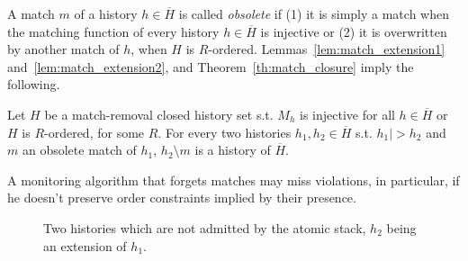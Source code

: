 A match $m$ of a history $h\in  \overline{H}$ is called \emph{obsolete} if (1) it is simply a
match when the matching function of every history $h\in \overline{H}$
is injective or (2) it is overwritten by another match of $h$, when $H$
is $R$-ordered.
Lemmas~\ref{lem:match_extension1} and~\ref{lem:match_extension2},  and 
Theorem~\ref{th:match_closure} imply the following.

\begin{corollary}\label{cor:matching_final}

Let $H$ be a match-removal closed history set 
s.t.
$M_h$ is injective for all $h\in \overline{H}$ or $H$ is $R$-ordered,
for some $R$.
For every two histories $h_1, h_2\in \overline{H}$ s.t. $h_1 |> h_2$ and
$m$ an obsolete match of $h_1$, 
$h_2\setminus m$ is a history of $\overline{H}$.

\end{corollary}

A monitoring algorithm that forgets matches may miss violations, 
in particular, if he doesn't preserve
order constraints implied by their presence.
%

\begin{figure}



\caption{Two histories which are not admitted by the atomic stack, $h_2$ being an extension of $h_1$.}
\label{fig:removal_no_saturation}

\end{figure}

